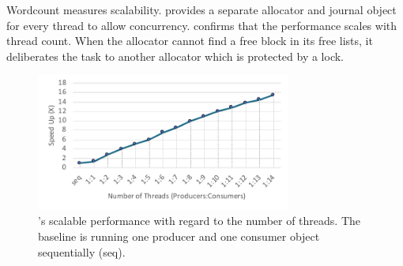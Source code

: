 Wordcount measures scalability.  \This{} provides
a separate allocator and journal object for every thread to allow concurrency. %
 confirms that the performance scales with thread count.
When the allocator cannot find a free block in its free lists, it deliberates the task to another allocator which is protected by a lock.

\begin{figure}
    \begin{center}
    \includegraphics[width=3.3in]{Graphs/scal.pdf}
    \end{center}
    \caption{\label{fig:scal} \this{}'s scalable performance with regard to the number of threads. The baseline is running one producer and one consumer object sequentially (seq).}
\end{figure}